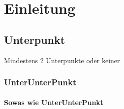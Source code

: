 \section{Einleitung}

\subsection{Unterpunkt}
Mindestens 2 Unterpunkte oder keiner
\subsubsection{UnterUnterPunkt}

\paragraph{Sowas wie UnterUnterPunkt}
